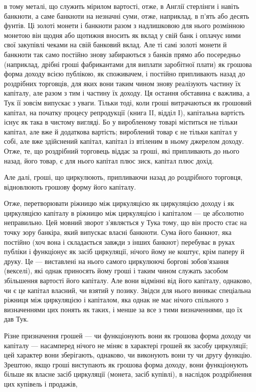 \parcont{}  %
в тому металі, що служить мірилом вартості, отже, в Англії
стерлінги і навіть банкноти, а саме банкноти на незначні суми,
отже, наприклад, в п’ять або десять фунтів. Ці золоті монети
і банкноти разом з надлишковою для нього розмінною монетою він щодня або щотижня вносить як вклад у
свій банк
і оплачує ними свої закупівлі чеками на свій банковий вклад.
Але ті самі золоті монети й банкноти так само постійно знову
забираються з банків прямо або посередньо (наприклад, дрібні
гроші фабрикантами для виплати заробітної плати) як грошова
форма доходу всією публікою, як споживачем, і постійно припливають назад до роздрібних торговців,
для яких вони таким чином знову реалізують частину їх капіталу, але разом
з тим і частину їх доходу. Ця остання обставина є важлива,
а Тук її зовсім випускає з уваги. Тільки тоді, коли гроші
витрачаються як грошовий капітал,  на початку процесу репродукції (книга II, відділ І), капітальна
вартість існує як така в
чистому вигляді. Бо у виробленому товарі міститься не тільки
капітал, але вже й додаткова вартість; вироблений товар є не
тільки капітал у собі, але вже здійснений капітал, капітал із
втіленим в ньому джерелом доходу. Отже, те, що роздрібний
торговець віддає за гроші, які припливають до нього назад,
його товар, є для нього капітал плюс зиск, капітал плюс дохід.

Але далі, гроші, що циркулюють, припливаючи назад до
роздрібного торговця, відновлюють грошову форму його капіталу.

Отже, перетворювати ріжницю між циркуляцією як циркуляцією доходу і як циркуляцією капіталу в
ріжницю між циркуляцією і капіталом — це абсолютно неправильно. Цей мовний
зворот з’являється у Тука тому, що він просто стає на точку
зору банкіра, який випускає власні банкноти. Сума його банкнот, яка постійно (хоч вона і складається
завжди з інших банкнот) перебуває в руках публіки і функціонує як засіб циркуляції, нічого йому не
коштує, крім паперу й друку. Це —
виставлені на нього самого циркулюючі боргові зобов’язання
(векселі), які однак приносять йому гроші і таким чином служать засобом збільшення вартості його
капіталу. Але вони відмінні від його капіталу, однаково, чи є це капітал власний, чи
взятий у позику. Звідси для нього виникає спеціальна ріжниця
між циркуляцією і капіталом, яка однак не має нічого спільного
з визначеннями цих понять як таких, і менше за все з тими
визначеннями, що їх дав Тук.

Різне призначення грошей — чи функціонують вони як грошова форма доходу чи капіталу — насамперед
нічого не міняє
в характері грошей як засобу циркуляції; цей характер вони
зберігають, однаково, чи виконують вони ту чи другу функцію.
Зрештою, якщо гроші виступають як грошова форма доходу,
вони функціонують більше як власне засіб циркуляції (монета,
засіб купівлі), в наслідок роздрібнення цих купівель і продажів,
\parbreak{}  %
